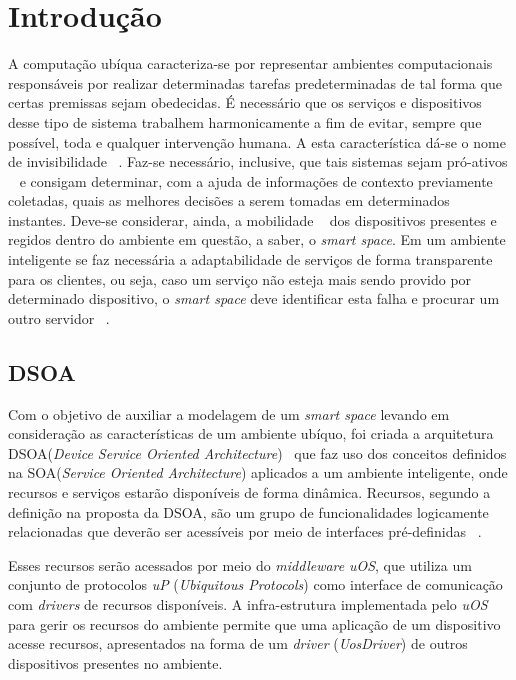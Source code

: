 \chapter{Introdução}

A computação ubíqua caracteriza-se por representar ambientes computacionais responsáveis por realizar determinadas tarefas predeterminadas de tal forma que certas premissas sejam obedecidas. É necessário que os serviços e dispositivos desse tipo de sistema trabalhem harmonicamente a fim de evitar, sempre que possível, toda e qualquer intervenção humana. A esta característica dá-se o nome de invisibilidade ~\cite{gomes2007, weiser1993, weiser1999}. Faz-se necessário, inclusive, que tais sistemas sejam pró-ativos ~\cite{gomes2007, buzeto2010} e consigam determinar, com a ajuda de informações de contexto previamente coletadas, quais as melhores decisões a serem tomadas em determinados instantes. Deve-se considerar, ainda, a mobilidade ~\cite{gomes2007, buzeto2010, weiser1999} dos dispositivos presentes e regidos dentro do ambiente em questão, a saber, o \emph{smart space}. Em um ambiente inteligente se faz necessária a adaptabilidade de serviços de forma transparente para os clientes, ou seja, caso um serviço não esteja mais sendo provido por determinado dispositivo, o \emph{smart space} deve identificar esta falha e procurar um outro servidor ~\cite{gomes2007, passarinho2008, paranhos2009}.

\section{DSOA}

Com o objetivo de auxiliar a modelagem de um \emph{smart space} levando em consideração as características de um ambiente ubíquo, foi criada a arquitetura DSOA(\emph{Device Service Oriented Architecture})~\cite{buzeto2010} que faz uso dos conceitos definidos na SOA(\emph{Service Oriented Architecture}) aplicados a um ambiente inteligente, onde recursos e serviços estarão disponíveis de forma dinâmica. Recursos, segundo a definição na proposta da DSOA, são um grupo de funcionalidades logicamente relacionadas que deverão ser acessíveis por meio de interfaces pré-definidas ~\cite{buzeto2010}. 

Esses recursos serão acessados por meio do \emph{middleware} \emph{uOS}, que utiliza um conjunto de protocolos \emph{uP} (\emph{Ubiquitous Protocols}) como interface de comunicação com \emph{drivers} de recursos disponíveis. A infra-estrutura implementada pelo \emph{uOS} para gerir os recursos do ambiente permite que uma aplicação de um dispositivo acesse recursos, apresentados na forma de um \emph{driver} (\emph{UosDriver}) de outros dispositivos presentes no ambiente.

